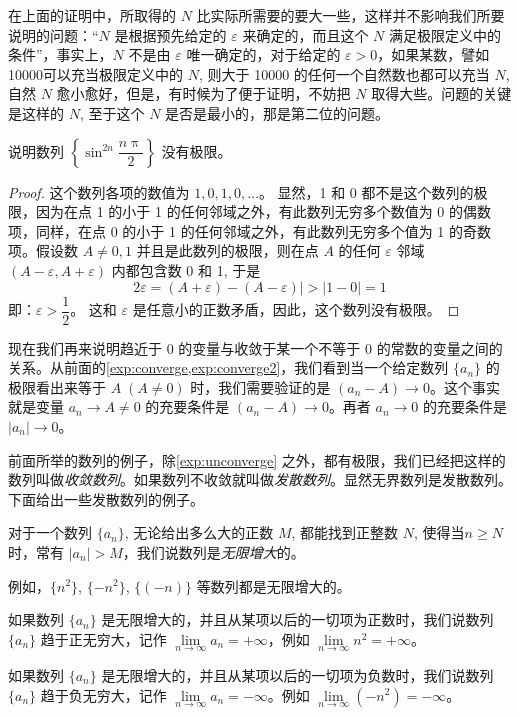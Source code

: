 \bigskip
在上面的证明中，所取得的 $N$ 比实际所需要的要大一些，这样并不影响我们所要说明的问题：“$N$ 是根据预先给定的 $\varepsilon$ 来确定的，而且这个 $N$ 满足极限定义中的条件”，事实上，$N$ 不是由 $\varepsilon$ 唯一确定的，对于给定的 $\varepsilon>0$，如果某数，譬如 10000可以充当极限定义中的 $N$, 则大于 10000 的任何一个自然数也都可以充当 $N$, 自然 $N$ 愈小愈好，但是，有时候为了便于证明，不妨把 $N$ 取得大些。问题的关键是这样的 $N$, 至于这个 $N$ 是否是最小的，那是第二位的问题。

\begin{example}\label{exp:unconverge}
说明数列 $\left\{\sin^{2n}\dfrac{n\uppi}{2}\right\}$ 没有极限。
\end{example}

\begin{proof}
这个数列各项的数值为 $1,0,1,0,\ldots$。
显然，1 和 0 都不是这个数列的极限，因为在点 1 的小于 1 的任何邻域之外，有此数列无穷多个数值为 0 的偶数项，同样，在点 0 的小于 1 的任何邻域之外，有此数列无穷多个值为 1 的奇数项。假设数 $A\ne 0,1$ 并且是此数列的极限，则在点 $A$ 的任何 $\varepsilon$ 邻域 $(A-\varepsilon ,A+\varepsilon )$ 内都包含数 0 和 1, 于是
\[2\varepsilon =(A+\varepsilon )-(A-\varepsilon )|>|1-0|=1\]
即：$\varepsilon>\dfrac{1}{2}$。
这和 $\varepsilon$ 是任意小的正数矛盾，因此，这个数列没有极限。
\end{proof}

\medskip
现在我们再来说明趋近于 0 的变量与收敛于某一个不等于 0 的常数的变量之间的关系。从前面的\cref{exp:converge,exp:converge2}，我们看到当一个给定数列 $\{a_n\}$ 的极限看出来等于 $A\; (A\ne 0)$ 时，我们需要验证的是 $(a_n-A)\to 0$。这个事实就是变量 $a_n\to A\ne 0$ 的充要条件是 $(a_n-A)\to 0$。再者 $a_n\to 0$ 的充要条件是 $|a_n|\to 0$。

前面所举的数列的例子，除\cref{exp:unconverge} 之外，都有极限，我们已经把这样的数列叫做\emph{收敛数列}。如果数列不收敛就叫做\emph{发散数列}。显然无界数列是发散数列。下面给出一些发散数列的例子。

对于一个数列 $\{a_n\}$, 无论给出多么大的正数 $M$, 都能找到正整数 $N$, 使得当$n\geqslant N$ 时，常有 $|a_n|>M$，我们说数列是\emph{无限增大}的。

例如，$\{n^2\}$, $\{-n^2\}$, $\{(-n)\}$ 等数列都是无限增大的。

{\linespread{1.5}\selectfont
如果数列 $\{a_n\}$ 是无限增大的，并且从某项以后的一切项为正数时，我们说数列 $\{a_n\}$ 趋于正无穷大，记作 $\lim\limits_{n\to\infty}a_n=+\infty$，例如 $\lim\limits_{n\to\infty}n^2=+\infty$。

如果数列 $\{a_n\}$ 是无限增大的，并且从某项以后的一切项为负数时，我们说数列 $\{a_n\}$ 趋于负无穷大，记作 $\lim\limits_{n\to\infty}a_n=-\infty$。例如 $\lim\limits_{n\to\infty}(-n^2)=-\infty$。\par
}

